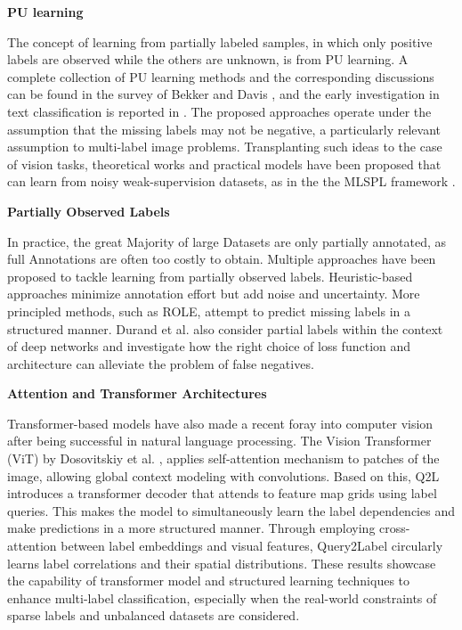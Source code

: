 \documentclass[lettersize,journal]{IEEEtran}
\renewcommand{\paragraph}[1]{%
  \vspace{1.5ex}\textbf{#1}\quad
}
\begin{document}
\paragraph{PU learning} 
The concept of learning from partially labeled samples, in which only positive labels are observed while the others are unknown, is from PU learning. A complete collection of PU learning methods and the corresponding discussions can be found in the survey of Bekker and Davis \cite{Bekker_2020}, and the early investigation in text classification is reported in \cite{Li_2003}. The proposed approaches operate under the assumption that the missing labels may not be negative, a particularly relevant assumption to multi-label image problems. Transplanting such ideas to the case of vision tasks, theoretical works and practical models have been proposed that can learn from noisy weak-supervision datasets, as in the the MLSPL framework \cite{mlsp}.


\paragraph{Partially Observed Labels}
In practice, the great Majority of large Datasets are only partially annotated, as full Annotations are often too costly to obtain. Multiple approaches have been proposed to tackle learning from partially observed labels. Heuristic-based approaches \cite{mlsp} minimize annotation effort but add noise and uncertainty. More principled methods, such as ROLE, attempt to predict missing labels in a structured manner. Durand et al. \cite{durand2019learningdeepconvnetmultilabel} also consider partial labels within the context of deep networks and investigate how the right choice of loss function and architecture can alleviate the problem of false negatives.


\paragraph{Attention and Transformer Architectures}
Transformer-based models have also made a recent foray into computer vision after being successful in natural language processing. The Vision Transformer (ViT) by Dosovitskiy et al. \cite{dosovitskiy2021imageworth16x16words}, applies self-attention mechanism to patches of the image, allowing global context modeling with convolutions. Based on this, Q2L \cite{Query2Label} introduces a transformer decoder that attends to feature map grids using label queries. This makes the model to simultaneously learn the label dependencies and make predictions in a more structured manner. Through employing cross-attention between label embeddings and visual features, Query2Label circularly learns label correlations and their spatial distributions. These results showcase the capability of transformer model and structured learning techniques to enhance multi-label classification, especially when the real-world constraints of sparse labels and unbalanced datasets are considered.
\end{document}
